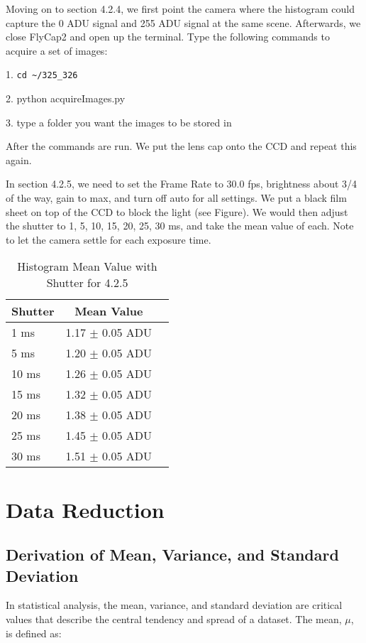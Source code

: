 \documentclass[10pt, preprint]{aastex}
\begin{document}
Moving on to section 4.2.4, we first point the camera where the histogram could capture the 0 ADU signal and 255 ADU signal at the same scene. Afterwards, we close FlyCap2 and open up the terminal. Type the following commands to acquire a set of images:

1. \texttt{cd \textasciitilde/325\_326}

2. python acquireImages.py

3. type a folder you want the images to be stored in

After the commands are run. We put the lens cap onto the CCD and repeat this again.

In section 4.2.5, we need to set the Frame Rate to 30.0 fps, brightness about 3/4 of the way, gain to max, and turn off auto for all settings. We put a black film sheet on top of the CCD to block the light (see Figure). We would then adjust the shutter to 1, 5, 10, 15, 20, 25, 30 ms, and take the mean value of each. Note to let the camera settle for each exposure time.

\begin{table}[H]
\centering
\begin{tabular}{lcr}
\hline
Shutter & Mean Value\\\hline
1 ms & 1.17 $\pm$ 0.05 ADU \\
5 ms & 1.20 $\pm$ 0.05 ADU \\
10 ms & 1.26 $\pm$ 0.05 ADU \\
15 ms & 1.32 $\pm$ 0.05 ADU \\
20 ms & 1.38 $\pm$ 0.05 ADU\\
25 ms & 1.45 $\pm$ 0.05 ADU\\
30 ms & 1.51 $\pm$ 0.05 ADU
\end{tabular}
\caption{\label{table:meanvaluedarkcurrent}Histogram Mean Value with Shutter for 4.2.5}
\end{table}

\section{Data Reduction}\label{sec:reduction}

\subsection{Derivation of Mean, Variance, and Standard Deviation}

In statistical analysis, the mean, variance, and standard deviation are critical values that describe the central tendency and spread of a dataset. The mean, $\mu$, is defined as:
\end{document}
